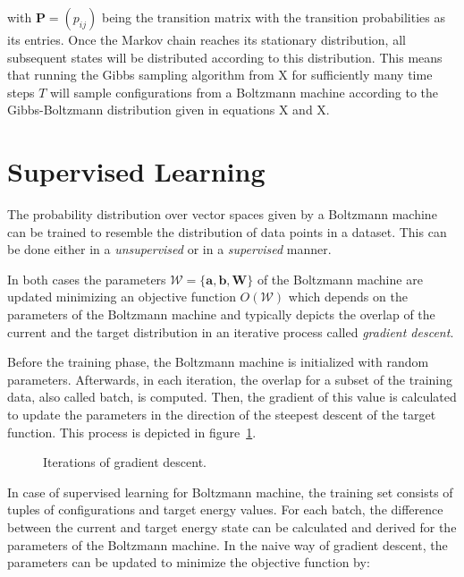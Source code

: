 with $\bm{P} = (p_{ij})$ being the transition matrix with the transition probabilities as its entries.
Once the Markov chain reaches its stationary distribution, all subsequent states will be distributed 
according to this distribution. This means that running the Gibbs sampling algorithm from X for 
sufficiently many time steps $T$ will sample configurations from a Boltzmann machine according 
to the Gibbs-Boltzmann distribution given in equations X and X.
    
\section{Supervised Learning}
The probability distribution over vector spaces given by a Boltzmann machine can be trained to 
resemble the distribution of data points in a dataset. This can be done either in a \textit{unsupervised}
or in a \textit{supervised} manner.

In both cases the parameters $\mathcal{W} = \{\bm{a},\bm{b},\bm{W}\}$ of the Boltzmann machine are updated minimizing 
an objective function $O(\mathcal{W})$ which depends on the parameters of the Boltzmann machine and 
typically depicts the overlap of the current and the target distribution in an iterative process called 
\textit{gradient descent}.

Before the training phase, the Boltzmann machine is initialized with random parameters. Afterwards, in each 
iteration, the overlap for a subset of the training data, also called batch, is computed. Then, the gradient of 
this value is calculated to update the parameters in the direction of the steepest descent of the target function.
This process is depicted in figure~\ref{fig:sgd}.

\begin{figure}[H]
    \label{fig:sgd}
    \centering
    \caption{Iterations of gradient descent.} 
\end{figure}

In case of supervised learning for Boltzmann machine, the training set consists of tuples of configurations 
and target energy values. For each batch, the difference between the current and target energy state can be 
calculated and derived for the parameters of the Boltzmann machine. In the naive way of gradient descent, 
the parameters can be updated to minimize the objective function by:

